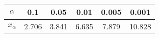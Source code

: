 \begin{table}[H]
    \centering
    \begin{tabular}{|c|c|c|c|c|c|}
        \hline
        \(\alpha\) & 0.1   & 0.05  & 0.01  & 0.005 & 0.001  \\
        \hline
        \(x_{\alpha}\) & 2.706 & 3.841 & 6.635 & 7.879 & 10.828 \\
        \hline
    \end{tabular}
\end{table}

\(\)
